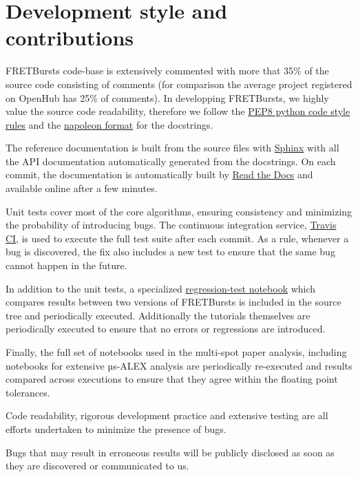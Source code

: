 \section{Development style and contributions}

FRETBursts code-base is extensively commented with more that 35\%
of the source code consisting of comments (for comparison the average project
registered on OpenHub has 25\% of comments).
In developping FRETBursts, we highly value the source code readability,
therefore we follow the
\href{https://www.python.org/dev/peps/pep-0008/}{PEP8 python code style rules} and
the \href{http://sphinxcontrib-napoleon.readthedocs.org/}{napoleon format}
for the docstrings.

The reference documentation is built from the source files with \href{http://sphinx-doc.org/}{Sphinx} with
all the API documentation automatically generated from the docstrings.
On each commit, the documentation is automatically built by
\href{https://readthedocs.org/}{Read the Docs}
and available online after a few minutes.

Unit tests cover most of the core algorithms, ensuring consistency and
minimizing the probability of introducing bugs. The continuous integration
service, \href{http://travis-ci.org}{Travis CI}, is used to execute the full
test suite after each commit.
As a rule, whenever a bug is discovered, the  fix also includes a new test
to ensure that the same bug cannot happen in the future.

In addition to the unit tests, a specialized
\href{https://github.com/tritemio/FRETBursts/blob/master/notebooks/dev/tests/FRETBursts\%20-\%20Regression\%20tests.ipynb}{regression-test notebook}
which compares results between two versions of FRETBursts is
included in the source tree and periodically executed. Additionally
the tutorials themselves are periodically executed to ensure that
no errors or regressions are introduced.

Finally, the full set of notebooks used in the multi-spot paper analysis,
including notebooks for extensive µs-ALEX analysis are periodically
re-executed and results compared across executions to ensure that
they agree within the floating point tolerances.

Code readability, rigorous development practice and extensive testing
are all efforts undertaken to minimize the presence of bugs.

Bugs that may result in erroneous results will be publicly disclosed as soon as
they are discovered or communicated to us.
